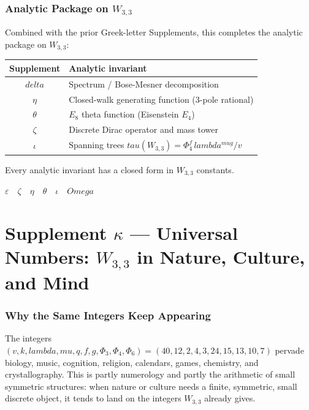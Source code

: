 \documentclass[12pt,a4paper]{article}
\def\delta{delta}%
\def\lambda{lambda}%
\def\mu{mu}%
\def\Phi#1{Phi#1}%
\def\tau{tau}%
\def\Omega{Omega}%
\theoremstyle{definition}
\begin{document}
\section*{Analytic Package on $W_{3,3}$}

Combined with the prior Greek-letter Supplements, this completes the
analytic package on $W_{3,3}$:

\begin{center}
\renewcommand{\arraystretch}{1.3}
\begin{tabular}{cl}
\toprule
Supplement & Analytic invariant \\
\midrule
$\delta$ & Spectrum / Bose-Mesner decomposition \\
$\eta$   & Closed-walk generating function (3-pole rational) \\
$\theta$ & $E_8$ theta function (Eisenstein $E_4$) \\
$\zeta$  & Discrete Dirac operator and mass tower \\
$\iota$  & Spanning trees $\tau(W_{3,3}) = \Phi_4^f\,\lambda^{\mu g}/v$ \\
\bottomrule
\end{tabular}
\end{center}

Every analytic invariant has a closed form in $W_{3,3}$ constants.

\hfill$\varepsilon\quad\zeta\quad\eta\quad\theta\quad\iota\quad\Omega$

\clearpage
\part*{\texorpdfstring{Supplement $\kappa$ --- Universal Numbers: $W_{3,3}$ in Nature, Culture, and Mind}{Supplement kappa --- Universal Numbers: W(3,3) in Nature, Culture, and Mind}}

\section*{Why the Same Integers Keep Appearing}

The integers $(v, k, \lambda, \mu, q, f, g, \Phi_3, \Phi_4, \Phi_6) =
(40, 12, 2, 4, 3, 24, 15, 13, 10, 7)$ pervade biology, music,
cognition, religion, calendars, games, chemistry, and crystallography.
This is partly numerology and partly the arithmetic of small symmetric
structures: when nature or culture needs a finite, symmetric, small
discrete object, it tends to land on the integers $W_{3,3}$ already
gives.
\end{document}

